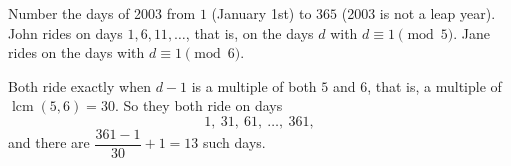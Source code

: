 Number the days of 2003 from $1$ (January 1st) to $365$ (2003 is not a leap year). John rides on days $1,6,11,\dots$, that is, on the days $d$ with $d\equiv1\pmod5$. Jane rides on the days with $d\equiv1\pmod6$.

Both ride exactly when $d-1$ is a multiple of both $5$ and $6$, that is, a multiple of $\operatorname{lcm}(5,6)=30$. So they both ride on days
\[
1,\ 31,\ 61,\ \dots,\ 361 ,
\]
and there are $\dfrac{361-1}{30}+1=\boxed{13}$ such days.
